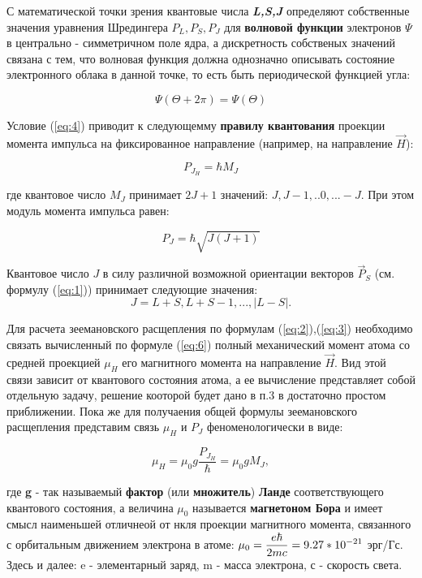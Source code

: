С математической точки зрения квантовые числа \textbf{\textsl{ L,S,J}} определяют собственные значения уравнения Шредингера $\mathbf{\mathit{P_L,P_S,P_J}}$ 
для \textbf{волновой функции} электронов $\Psi$ в центрально - симметричном поле ядра, а дискретность собственых значений связана с тем, что волновая функция должна однозначно описывать состояние электронного облака в данной точке, то есть быть периодической функцией угла:

\begin{equation}
\Psi(\Theta+2\pi)=\Psi(\Theta)
\label{eq:4} 
\end{equation}

Условие (\ref{eq:4}) приводит к следующемму \textbf{правилу квантования} проекции момента импульса на фиксированное направление (например, на направление $\vec{H}$):

\begin{equation}
P_{J_H} = \hbar M_J
\label{eq:5} 
\end{equation}

где квантовое число $M_{J}$ принимает $2J+1$ значений: $J,J-1,..0,...-J$.  При этом модуль момента импульса равен: 

\begin{equation}
P_{J}=\hbar \sqrt {J(J+1)}
\label{eq:6} 
\end{equation}

Квантовое число $J$ в силу различной возможной ориентации векторов $\vec P_S$ (см. формулу (\ref{eq:1})) принимает следующие значения: $$J=L+S,L+S-1,...,|L-S|.$$

Для расчета зеемановского расщепления по формулам (\ref{eq:2}),(\ref{eq:3}) необходимо связать вычисленный по формуле (\ref{eq:6}) полный механический момент атома со средней проекцией 
$\mu_H$ его магнитного момента на направление $\vec H$. Вид этой связи зависит от квантового состояния атома, а ее вычисление представляет собой отдельную задачу, решение кооторой будет дано в п.3 в достаточно простом приближении. Пока же для получаения общей формулы зеемановского расщепления представим связь $\mu_H$ и $P_J$ феноменологически в виде: 

\begin{equation}
\mu_{H}=\mu_{0} g \frac{P_{J_H}}{\hbar}=\mu_{0} g M_{J},
\label{eq:7} 
\end{equation}

где \textbf{g} - так называемый \textbf{фактор} (или \textbf{множитель}) \textbf{Ланде} соответствующего квантового состояния, а величина $\mu_0$ называется \textbf{магнетоном Бора} и имеет смысл наименьшей отличнеой от нкля проекции магнитного момента, связанного с орбитальным движением электрона в атоме: 
$\displaystyle{\mu_{0} = \huge{\frac{e\hbar}{2mc}}=9.27*10^{-21}}$
эрг/Гс.
Здесь и далее: e - элементарный заряд, m - масса электрона, с - скорость света.

